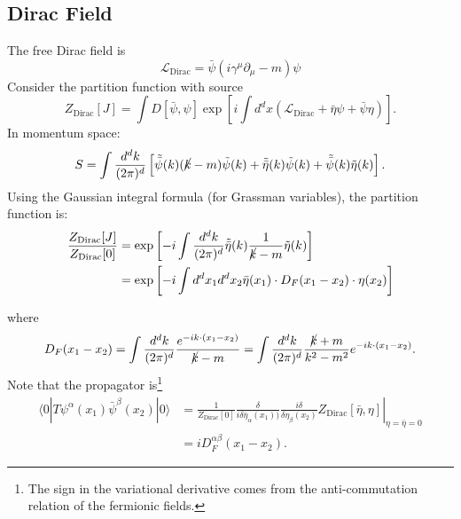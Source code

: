 \subsection{Dirac Field}
The free Dirac field is
\begin{equation}
	\mathcal{L}_{\mathrm{Dirac}}
	= \bar\psi \left(i\gamma^\mu \partial_\mu - m\right)\psi
\end{equation}
Consider the partition function with source
\begin{equation}
	Z_{\mathrm{Dirac}}[J]
	= \int D[\bar\psi,\psi] \exp\left[i\int d^dx \left(\mathcal{L}_{\mathrm{Dirac}}+\bar{\eta}\psi + \bar\psi\eta \right) \right].
\end{equation}
In momentum space:
\begin{equation}
	S = \int\frac{d^d k}{(2\pi)^d} \left[
		\tilde{\bar\psi}(k)(\cancel{k}-m)\tilde{\psi}(k) +
		\tilde{\bar\eta}(k) \tilde{\psi}(k) +
		\tilde{\bar\psi}(k) \tilde{\eta}(k)
	\right].
\end{equation}
Using the Gaussian integral formula (for Grassman variables), the partition function is:
\begin{equation}
\begin{aligned}
	\frac{Z_{\mathrm{Dirac}}[J]}{Z_{\mathrm{Dirac}}[0]}
	&= \exp\left[-i\int \frac{d^d k}{(2\pi)^d} \tilde{\bar\eta}(k)\frac{1}{\cancel{k}-m}\tilde\eta(k)\right] \\
	&= \exp\left[-i\int d^dx_1 d^d x_2 \bar{\eta}(x_1)\cdot D_F(x_1-x_2)\cdot \eta(x_2) \right]
\end{aligned}
\end{equation}

where
\begin{equation}
	D_F(x_1-x_2) = \int \frac{d^d k}{(2\pi)^d} \frac{e^{-i k \cdot (x_1-x_2)}}{\cancel{k}-m}
	= \int \frac{d^d k}{(2\pi)^d} \frac{\cancel{k}+m}{k^2-m^2} e^{-i k \cdot (x_1-x_2)}.
\end{equation}
Note that the propagator is\footnote{The sign in the variational derivative comes from the anti-commutation relation of the fermionic fields.}
\begin{equation}
\begin{aligned}
	\langle 0| T \psi^\alpha(x_1) \bar\psi^\beta(x_2) |0\rangle
	&= \left.\frac{1}{Z_{\mathrm{Dirac}}[0]}\frac{\delta}{i\delta \bar{\eta}_\alpha(x_1))}\frac{i\delta}{\delta\eta_\beta(x_2)} Z_{\mathrm{Dirac}}[\bar\eta,\eta]\right|_{\eta=\bar\eta=0} \\
	&= i D^{\alpha\beta}_F(x_1-x_2).
\end{aligned}
\end{equation}


